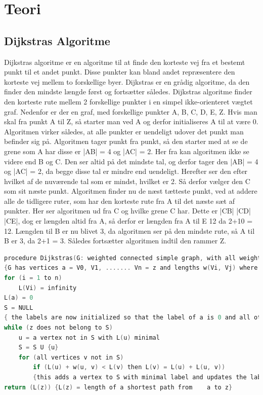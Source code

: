 \chapter{Teori}\label{Teori}

\section{Dijkstras Algoritme}

Dijkstras algoritme er en algoritme til at finde den korteste vej fra et bestemt punkt til et andet punkt. Disse punkter kan bland andet repræsentere den korteste vej mellem to forskellige byer. Dijkstras er en grådig algoritme, da den finder den mindste længde først og fortsætter således.\cite{DMATBOGEN}
Dijkstras algoritme finder den korteste rute mellem 2 forskellige punkter i en simpel ikke-orienteret vægtet graf. Nedenfor er der en graf, med forskellige punkter {A, B, C, D, E, Z}. Hvis man skal fra punkt A til Z, så starter man ved A og derfor initialiseres A til at være 0. Algoritmen virker således, at alle punkter er uendeligt udover det punkt man befinder sig på. Algoritmen tager punkt fra punkt, så den starter med at se de grene som A har disse er |AB| = 4 og |AC| = 2. Her fra kan algoritmen ikke se videre end B og C. Den ser altid på det mindste tal, og derfor tager den |AB| = 4 og |AC| = 2, da begge disse tal er mindre end uendeligt. Herefter ser den efter hvilket af de nuværende tal som er mindst, hvilket er 2. Så derfor vælger den C som sit næste punkt. Algoritmen finder nu de næst tætteste punkt, ved at addere alle de tidligere ruter, som har den korteste rute fra A til det næste sæt af punkter. Her ser algoritmen ud fra C og hvilke grene C har. Dette er |CB| |CD| |CE|, dog er længden altid fra A, så derfor er længden fra A til E 12 da 2+10 = 12. Længden til B er nu blivet 3, da algoritmen ser på den mindste rute, så A til B er 3, da 2+1 = 3. Således fortsætter algoritmen indtil den rammer Z.\cite{DMATBOGEN}

\begin{lstlisting}[language=C,caption={Dijkstras angivet som eksempel i pseudo-kode},label={lst:DijsktrasPseudo1}]
	procedure Dijkstras(G: weighted connected simple graph, with all weights positive)
{G has vertices a = V0, V1, ....... Vn = z and lengths w(Vi, Vj) where w(Vi,Vj) = infinity if{Vi, Vj} is not an edge in G}
for (i = 1 to n)
	L(Vi) = infinity
L(a) = 0
S = NULL
{ the labels are now initialized so that the label of a is 0 and all other labels are infinity, and S is the empty set }
while (z does not belong to S)
	u = a vertex not in S with L(u) minimal
	S = S U {u}
	for (all vertices v not in S)
		if (L(u) + w(u, v) < L(v) then L(v) = L(u) + L(u, v))
		{this adds a vertex to S with minimal label and updates the labels of vertices not in S}
return (L(z)) {L(z) = length of a shortest path from 	a to z}
\end{lstlisting}

